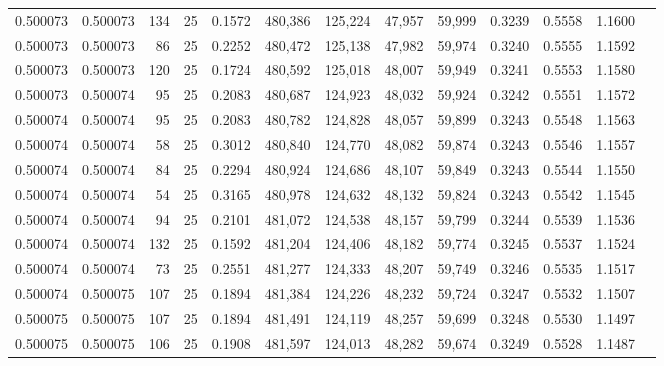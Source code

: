 \begin{tabular}{rrrrrrrrrrrrr}
0.500073 & 0.500073 &   134 &  25 &                                     0.1572 & 480,386 & 125,224 &  47,957 &  59,999 & 0.3239 & 0.5558 & 1.1600 \\
0.500073 & 0.500073 &    86 &  25 &                                     0.2252 & 480,472 & 125,138 &  47,982 &  59,974 & 0.3240 & 0.5555 & 1.1592 \\
0.500073 & 0.500073 &   120 &  25 &                                     0.1724 & 480,592 & 125,018 &  48,007 &  59,949 & 0.3241 & 0.5553 & 1.1580 \\
0.500073 & 0.500074 &    95 &  25 &                                     0.2083 & 480,687 & 124,923 &  48,032 &  59,924 & 0.3242 & 0.5551 & 1.1572 \\
0.500074 & 0.500074 &    95 &  25 &                                     0.2083 & 480,782 & 124,828 &  48,057 &  59,899 & 0.3243 & 0.5548 & 1.1563 \\
0.500074 & 0.500074 &    58 &  25 &                                     0.3012 & 480,840 & 124,770 &  48,082 &  59,874 & 0.3243 & 0.5546 & 1.1557 \\
0.500074 & 0.500074 &    84 &  25 &                                     0.2294 & 480,924 & 124,686 &  48,107 &  59,849 & 0.3243 & 0.5544 & 1.1550 \\
0.500074 & 0.500074 &    54 &  25 &                                     0.3165 & 480,978 & 124,632 &  48,132 &  59,824 & 0.3243 & 0.5542 & 1.1545 \\
0.500074 & 0.500074 &    94 &  25 &                                     0.2101 & 481,072 & 124,538 &  48,157 &  59,799 & 0.3244 & 0.5539 & 1.1536 \\
0.500074 & 0.500074 &   132 &  25 &                                     0.1592 & 481,204 & 124,406 &  48,182 &  59,774 & 0.3245 & 0.5537 & 1.1524 \\
0.500074 & 0.500074 &    73 &  25 &                                     0.2551 & 481,277 & 124,333 &  48,207 &  59,749 & 0.3246 & 0.5535 & 1.1517 \\
0.500074 & 0.500075 &   107 &  25 &                                     0.1894 & 481,384 & 124,226 &  48,232 &  59,724 & 0.3247 & 0.5532 & 1.1507 \\
0.500075 & 0.500075 &   107 &  25 &                                     0.1894 & 481,491 & 124,119 &  48,257 &  59,699 & 0.3248 & 0.5530 & 1.1497 \\
0.500075 & 0.500075 &   106 &  25 &                                     0.1908 & 481,597 & 124,013 &  48,282 &  59,674 & 0.3249 & 0.5528 & 1.1487 \\

\end{tabular}
